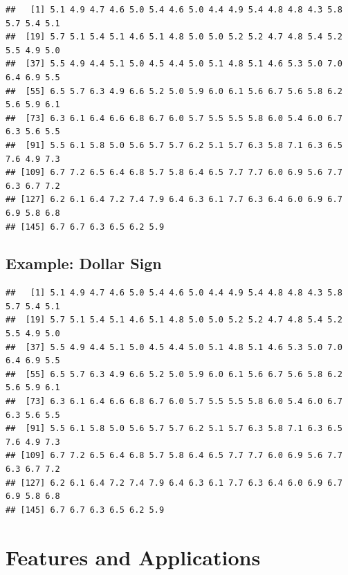 \documentclass[
]{book}
\newenvironment{Shaded}{\begin{snugshade}}{\end{snugshade}}
\newcommand{\CommentTok}[1]{\textcolor[rgb]{0.56,0.35,0.01}{\textit{#1}}}
\newcommand{\NormalTok}[1]{#1}
\newcommand{\OperatorTok}[1]{\textcolor[rgb]{0.81,0.36,0.00}{\textbf{#1}}}
\begin{document}
\begin{verbatim}
##   [1] 5.1 4.9 4.7 4.6 5.0 5.4 4.6 5.0 4.4 4.9 5.4 4.8 4.8 4.3 5.8 5.7 5.4 5.1
##  [19] 5.7 5.1 5.4 5.1 4.6 5.1 4.8 5.0 5.0 5.2 5.2 4.7 4.8 5.4 5.2 5.5 4.9 5.0
##  [37] 5.5 4.9 4.4 5.1 5.0 4.5 4.4 5.0 5.1 4.8 5.1 4.6 5.3 5.0 7.0 6.4 6.9 5.5
##  [55] 6.5 5.7 6.3 4.9 6.6 5.2 5.0 5.9 6.0 6.1 5.6 6.7 5.6 5.8 6.2 5.6 5.9 6.1
##  [73] 6.3 6.1 6.4 6.6 6.8 6.7 6.0 5.7 5.5 5.5 5.8 6.0 5.4 6.0 6.7 6.3 5.6 5.5
##  [91] 5.5 6.1 5.8 5.0 5.6 5.7 5.7 6.2 5.1 5.7 6.3 5.8 7.1 6.3 6.5 7.6 4.9 7.3
## [109] 6.7 7.2 6.5 6.4 6.8 5.7 5.8 6.4 6.5 7.7 7.7 6.0 6.9 5.6 7.7 6.3 6.7 7.2
## [127] 6.2 6.1 6.4 7.2 7.4 7.9 6.4 6.3 6.1 7.7 6.3 6.4 6.0 6.9 6.7 6.9 5.8 6.8
## [145] 6.7 6.7 6.3 6.5 6.2 5.9
\end{verbatim}

\hypertarget{example-dollar-sign}{%
\subsection*{Example: Dollar Sign}\label{example-dollar-sign}}

\begin{Shaded}
\end{Shaded}

\begin{verbatim}
##   [1] 5.1 4.9 4.7 4.6 5.0 5.4 4.6 5.0 4.4 4.9 5.4 4.8 4.8 4.3 5.8 5.7 5.4 5.1
##  [19] 5.7 5.1 5.4 5.1 4.6 5.1 4.8 5.0 5.0 5.2 5.2 4.7 4.8 5.4 5.2 5.5 4.9 5.0
##  [37] 5.5 4.9 4.4 5.1 5.0 4.5 4.4 5.0 5.1 4.8 5.1 4.6 5.3 5.0 7.0 6.4 6.9 5.5
##  [55] 6.5 5.7 6.3 4.9 6.6 5.2 5.0 5.9 6.0 6.1 5.6 6.7 5.6 5.8 6.2 5.6 5.9 6.1
##  [73] 6.3 6.1 6.4 6.6 6.8 6.7 6.0 5.7 5.5 5.5 5.8 6.0 5.4 6.0 6.7 6.3 5.6 5.5
##  [91] 5.5 6.1 5.8 5.0 5.6 5.7 5.7 6.2 5.1 5.7 6.3 5.8 7.1 6.3 6.5 7.6 4.9 7.3
## [109] 6.7 7.2 6.5 6.4 6.8 5.7 5.8 6.4 6.5 7.7 7.7 6.0 6.9 5.6 7.7 6.3 6.7 7.2
## [127] 6.2 6.1 6.4 7.2 7.4 7.9 6.4 6.3 6.1 7.7 6.3 6.4 6.0 6.9 6.7 6.9 5.8 6.8
## [145] 6.7 6.7 6.3 6.5 6.2 5.9
\end{verbatim}

\hypertarget{features-and-applications}{%
\section{Features and Applications}\label{features-and-applications}}
\end{document}
